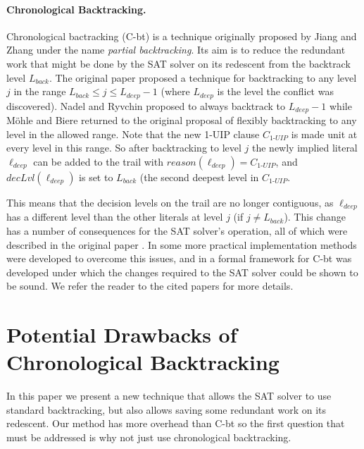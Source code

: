 \documentclass[runningheads]{llncs}
\newcommand{\sat}{SAT\xspace}
\newcommand{\dlevel}[1]{\ensuremath{\mathit{decLvl}(#1)}}
\newcommand{\reason}[1]{\ensuremath{\mathit{reason}(#1)}}
\newcommand{\uipcls}{C_{\textit{1-UIP}}}
\newcommand{\deepestLvl}{L_{\textit{deep}}}
\newcommand{\deepestLit}{\ell_{\textit{deep}}}
\newcommand{\btL}{L_{\textit{back}}}
\newcommand{\cbt}{C-bt\xspace}
\begin{document}
\paragraph{Chronological Backtracking.}
Chronological bactracking (\cbt) is a technique originally proposed by
Jiang and Zhang \cite{DBLP:conf/lpar/JiangZ13} under the name
\textit{partial backtracking}. Its aim is to reduce the redundant work
that might be done by the \sat solver on its redescent from the
backtrack level $\btL$. The original paper proposed a technique for
backtracking to any level $j$ in the range
$\btL \leq j \leq \deepestLvl{-}1$ (where $\deepestLvl$ is the level
the conflict was discovered). Nadel and Ryvchin
\cite{DBLP:conf/sat/NadelR18} proposed to always backtrack to
$\deepestLvl{-}1$ while M{\"{o}}hle and Biere
\cite{DBLP:conf/sat/MohleB19} returned to the original proposal of
flexibly backtracking to any level in the allowed range. Note that the
new 1-UIP clause $\uipcls$ is made unit at every level in this
range. So after backtracking to level $j$ the newly implied literal
$\deepestLit$ can be added to the trail with
$\reason{\deepestLit}=\uipcls$, and $\dlevel{\deepestLit}$ is set to
$\btL$ (the second deepest level in $\uipcls$.

This means that the decision levels on the trail are no longer
contiguous, as $\deepestLit$ has a different level than the other
literals at level $j$ (if $j\neq \btL$). This change has a number of
consequences for the \sat solver's operation, all of which were
described in the original paper \cite{DBLP:conf/lpar/JiangZ13}. In
\cite{DBLP:conf/sat/NadelR18} some more practical implementation
methods were developed to overcome this issues, and in
\cite{DBLP:conf/sat/MohleB19} a formal framework for \cbt was
developed under which the changes required to the \sat solver could be
shown to be sound. We refer the reader to the cited papers for
more details.

\section{Potential Drawbacks of Chronological Backtracking}
In this paper we present a new technique that allows the \sat solver
to use standard backtracking, but also allows saving some redundant
work on its redescent.  Our method has more overhead than \cbt so the
first question that must be addressed is why not just use
chronological backtracking.
\end{document}
